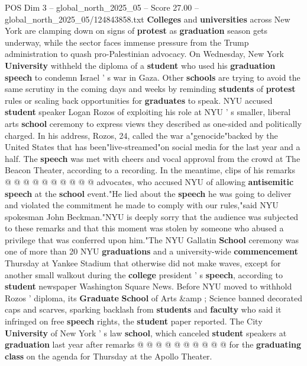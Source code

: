 \begin{textsample}{POS Dim 3 – global\_north\_2025\_05 – Score 27.00 – global\_north\_2025\_05/124843858.txt}  \label{ex:f3_pos_134}
\textbf{Colleges} and \textbf{universities} across New York are clamping down on signs of \textbf{protest} as \textbf{graduation} season gets underway, while the sector faces immense pressure from the Trump administration to quash pro-Palestinian advocacy.
On Wednesday, New York \textbf{University} withheld the diploma of a \textbf{student} who used his \textbf{graduation} \textbf{speech} to condemn Israel ' s war in Gaza.
Other \textbf{schools} are trying to avoid the same scrutiny in the coming days and weeks by reminding \textbf{students} of \textbf{protest} rules or scaling back opportunities for \textbf{graduates} to speak.
NYU accused \textbf{student} speaker Logan Rozos of exploiting his role at NYU ' s smaller, liberal arts \textbf{school} ceremony to express views they described as one-sided and politically charged.
In his address, Rozos, 24, called the war a"genocide"backed by the United States that has been"live-streamed"on social media for the last year and a half.
The \textbf{speech} was met with cheers and vocal approval from the crowd at The Beacon Theater, according to a recording.
In the meantime, clips of his remarks @ @ @ @ @ @ @ @ @ @ advocates, who accused NYU of allowing \textbf{antisemitic} \textbf{speech} at the \textbf{school} event."He lied about the \textbf{speech} he was going to deliver and violated the commitment he made to comply with our rules,"said NYU spokesman John Beckman."NYU is deeply sorry that the audience was subjected to these remarks and that this moment was stolen by someone who abused a privilege that was conferred upon him."The NYU Gallatin \textbf{School} ceremony was one of more than 20 NYU \textbf{graduations} and a university-wide \textbf{commencement} Thursday at Yankee Stadium that otherwise did not make waves, except for another small walkout during the \textbf{college} president ' s \textbf{speech}, according to \textbf{student} newspaper Washington Square News.
Before NYU moved to withhold Rozos ' diploma, its \textbf{Graduate} \textbf{School} of Arts \&amp ; Science banned decorated caps and scarves, sparking backlash from \textbf{students} and \textbf{faculty} who said it infringed on free \textbf{speech} rights, the \textbf{student} paper reported.
The City \textbf{University} of New York ' s law \textbf{school}, which canceled \textbf{student} speakers at \textbf{graduation} last year after remarks @ @ @ @ @ @ @ @ @ @ for the \textbf{graduating} \textbf{class} on the agenda for Thursday at the Apollo Theater.

\end{textsample}
